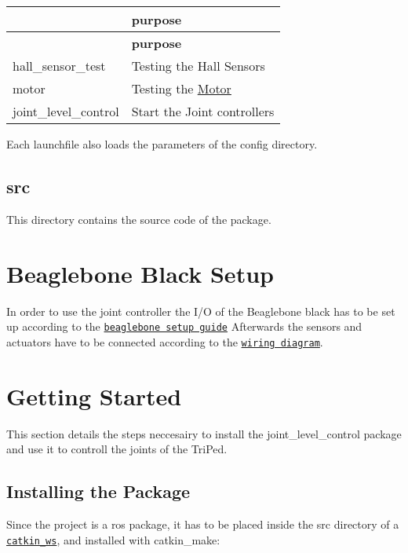 \tabulinesep=1mm
\begin{longtabu} spread 0pt [c]{*2{|X[-1]}|}
\hline
{}&{\bf purpose  }\\
\endfirsthead
\hline
\endfoot
\hline
{}&{\bf purpose  }\\
\endhead
hall\+\_\+sensor\+\_\+test &Testing the Hall Sensors \\
motor &Testing the \hyperlink{classMotor}{Motor} \\
joint\+\_\+level\+\_\+control &Start the Joint controllers \\
\end{longtabu}
Each launchfile also loads the parameters of the config directory. \hypertarget{index_src_dir}{}\subsection{src}\label{index_src_dir}
This directory contains the source code of the package.\hypertarget{index_bbb_setup}{}\section{Beaglebone Black Setup}\label{index_bbb_setup}
In order to use the joint controller the I/O of the Beaglebone black has to be set up according to the \href{https://github.com/TriPed-Robot/Wiki/wiki/Beaglebone-Setup}{\tt beaglebone setup guide} Afterwards the sensors and actuators have to be connected according to the \href{https://github.com/TriPed-Robot/Wiki/wiki/Wiring-diagram}{\tt wiring diagram}. \hypertarget{index_getting_started}{}\section{Getting Started}\label{index_getting_started}
This section details the steps neccesairy to install the joint\+\_\+level\+\_\+control package and use it to controll the joints of the Tri\+Ped.\hypertarget{index_install}{}\subsection{Installing the Package}\label{index_install}
Since the project is a ros package, it has to be placed inside the src directory of a \href{http://wiki.ros.org/catkin}{\tt catkin\+\_\+ws}, and installed with {\ttfamily catkin\+\_\+make}\+:

